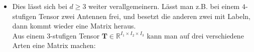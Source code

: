 \documentclass[11pt]{article} %
\begin{document}
\begin{itemize}
\item

\begin{changemargin}{0pt}{0pt}
Dies lässt sich bei $d\geq3$ weiter verallgemeinern. Lässt man z.B. bei einem $4$-stufigen Tensor zwei Antennen frei,
und besetzt die anderen zwei mit Labeln, dann kommt wieder eine Matrix heraus.\\
Aus einem $3$-stufigen Tensor $\mathbf{T} \in \mathbb{R}^{I_{1}\times I_{2} \times I_{3}}$ kann man auf drei verschiedene Arten eine Matrix machen:
\end{changemargin}
\begin{changemargin}{20pt}{20pt}

\begin{center}
\begin{minipage}{.2\textwidth}
%
%
\end{minipage}
\end{center}

\end{changemargin}


%
\begin{changemargin}{20pt}{20pt}


\end{changemargin}
\end{itemize}
\end{document}
